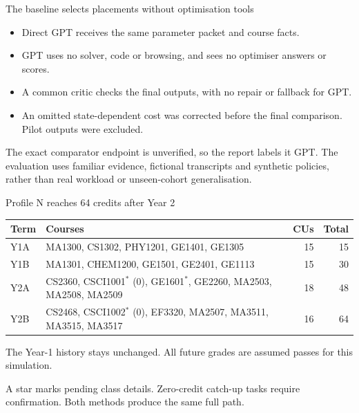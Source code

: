 \documentclass[aspectratio=169,11pt]{beamer}
\newcommand{\smallnote}[1]{\par{\footnotesize\color{muted}#1\par}}
\begin{document}
\begin{frame}{The baseline selects placements without optimisation tools}
\begin{itemize}\setlength{\itemsep}{7pt}
\item Direct GPT receives the same parameter packet and course facts.
\item GPT uses no solver, code or browsing, and sees no optimiser answers or scores.
\item A common critic checks the final outputs, with no repair or fallback for GPT.
\item An omitted state-dependent cost was corrected before the final comparison. Pilot outputs were excluded.
\end{itemize}
\smallnote{The exact comparator endpoint is unverified, so the report labels it GPT. The evaluation uses familiar evidence, fictional transcripts and synthetic policies, rather than real workload or unseen-cohort generalisation.}
\end{frame}

\begin{frame}{Profile N reaches 64 credits after Year 2}
\small
\begin{tabular}{lL{9.3cm}rr}
\toprule
Term & Courses & CUs & Total\\\midrule
Y1A & MA1300, CS1302, PHY1201, GE1401, GE1305 & 15 & 15\\[7pt]
Y1B & MA1301, CHEM1200, GE1501, GE2401, GE1113 & 15 & 30\\[7pt]
Y2A & CS2360, CSCI1001$^{*}$ (0), GE1601$^{*}$, GE2260, MA2503, MA2508, MA2509 & 18 & 48\\[7pt]
Y2B & CS2468, CSCI1002$^{*}$ (0), EF3320, MA2507, MA3511, MA3515, MA3517 & 16 & 64\\
\bottomrule
\end{tabular}\par
\vspace{3mm}
\normalsize The Year-1 history stays unchanged. All future grades are assumed passes for this simulation.
\smallnote{A star marks pending class details. Zero-credit catch-up tasks require confirmation. Both methods produce the same full path.}
\end{frame}
\end{document}
